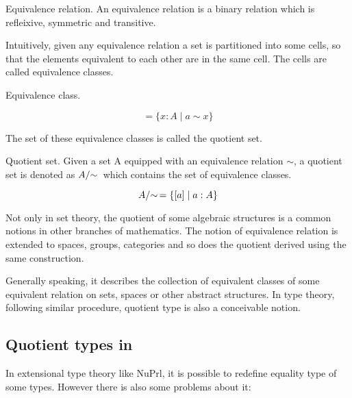 \begin{definition}

Equivalence relation. An equivalence relation is a binary
relation which is refleixive, symmetric and transitive.

\end{definition}

Intuitively, given any equivalence relation a set is partitioned into
some cells, so that the elements equivalent to each other are in the
same cell. The cells are called equivalence classes.

\begin{definition}

Equivalence class.

\begin{equation}
[ a ] = \{x : A \;| \; a \sim x \}
\end{equation}

\end{definition}

The set of these equivalence classes is called
the quotient set.

\begin{definition}

Quotient set. Given a set A equipped with an equivalence relation $\sim$, a quotient
set is denoted as $\qset{A}$ which contains the set of equivalence
classes.

\begin{equation}
\qset{A} = \{ [ a ] \;|\; a : A \}
\end{equation}

\end{definition}

Not only in set theory, the quotient of some algebraic structures is
a common notions in other branches of mathematics. The notion of
equivalence relation is extended to spaces, groups, categories and so
does the quotient derived using the same construction. 

Generally
speaking, it describes the collection of equivalent classes of some equivalent relation on sets, spaces or other abstract structures. In type theory, following similar procedure, quotient type is also a conceivable notion.

\subsection{Quotient types in \ett}

In extensional type theory like NuPrl, it is possible to redefine
equality type of some types. However there is also some problems about it:


